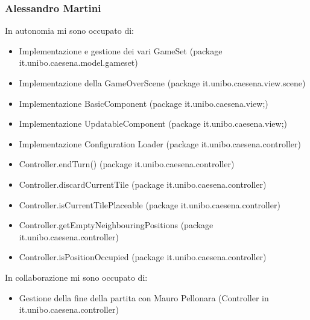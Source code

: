 \subsubsection*{Alessandro Martini}
In autonomia mi sono occupato di:
\begin{itemize}
    \item Implementazione e gestione dei vari GameSet (package it.unibo.caesena.model.gameset)
    \item Implementazione della GameOverScene (package it.unibo.caesena.view.scene)
    \item Implementazione BasicComponent (package it.unibo.caesena.view;)
    \item Implementazione UpdatableComponent (package it.unibo.caesena.view;)
    \item Implementazione Configuration Loader (package it.unibo.caesena.controller)
    \item Controller.endTurn() (package it.unibo.caesena.controller)
    \item Controller.discardCurrentTile (package it.unibo.caesena.controller)
    \item Controller.isCurrentTilePlaceable (package it.unibo.caesena.controller)
    \item Controller.getEmptyNeighbouringPositions (package it.unibo.caesena.controller)
    \item Controller.isPositionOccupied (package it.unibo.caesena.controller)
\end{itemize}
In collaborazione mi sono occupato di:
\begin{itemize}
    \item Gestione della fine della partita con Mauro Pellonara (Controller in it.unibo.caesena.controller)
\end{itemize}

